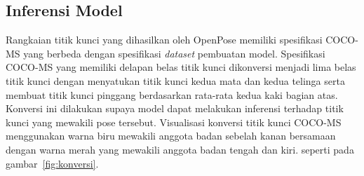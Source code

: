 
\subsection{Inferensi Model}

Rangkaian titik kunci yang dihasilkan oleh OpenPose memiliki spesifikasi COCO-MS yang berbeda dengan
spesifikasi \textit{dataset} pembuatan model. Spesifikasi COCO-MS yang memiliki delapan belas titik
kunci dikonversi menjadi lima belas titik kunci dengan menyatukan titik kunci kedua mata dan kedua telinga
serta membuat titik kunci pinggang berdasarkan rata-rata kedua kaki bagian atas.%
Konversi ini dilakukan supaya model dapat melakukan inferensi terhadap
titik kunci yang mewakili pose tersebut. Visualisasi konversi titik kunci COCO-MS menggunakan warna
biru mewakili anggota badan sebelah kanan bersamaan dengan warna merah yang mewakili anggota badan
tengah dan kiri. seperti pada gambar~\ref{fig:konversi}.


